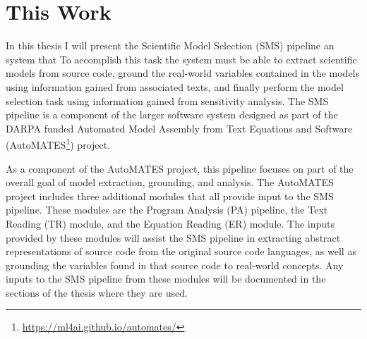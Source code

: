 \section{This Work\label{sec:this_work}}
In this thesis I will present the Scientific Model Selection (SMS) pipeline \ctm{:}  %
an %
system that 
To accomplish this task the system must be able to extract scientific models from source code, ground the real-world variables contained in the models using information gained from associated texts, and finally perform the model selection task using information gained from sensitivity analysis.
The SMS pipeline is a component of the larger software system designed as part of the DARPA funded Automated Model Assembly from Text Equations and Software (AutoMATES\footnote{\url{https://ml4ai.github.io/automates/}}) project.

As a component of the AutoMATES project, this pipeline focuses on part of the overall goal of model extraction, grounding, and analysis.
The AutoMATES project includes three additional modules that all provide input to the SMS pipeline.
These modules are the Program Analysis (PA) pipeline, the Text Reading (TR) module, and the Equation Reading (ER) module.
The inputs provided by these modules will assist the SMS pipeline in extracting abstract representations of source code from the original source code languages, as well as grounding the variables found in that source code to real-world concepts.
Any inputs to the SMS pipeline from these modules will be documented in the sections of the thesis where they are used.

